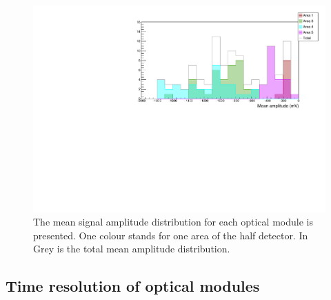 \begin{figure}[h]
  \centering
  \includegraphics[width=15cm]{commissioning/fig_commissioning/LI_mean_ampl.pdf}
  \caption{The mean signal amplitude distribution for each optical module is presented.
    One colour stands for one area of the half detector.
    In Grey is the total mean amplitude distribution.
    \label{fig:LI_ampl}}
\end{figure}


\subsection{Time resolution of optical modules}






